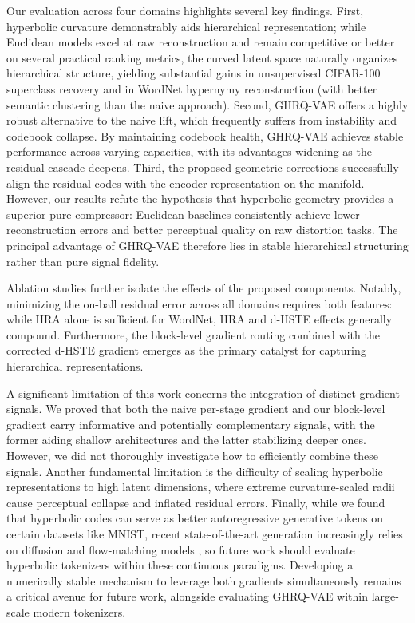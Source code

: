 \documentclass[12pt]{report}
\begin{document}
Our evaluation across four domains highlights several key findings. First, hyperbolic curvature demonstrably aids hierarchical representation; while Euclidean models excel at raw reconstruction and remain competitive or better on several practical ranking metrics, the curved latent space naturally organizes hierarchical structure, yielding substantial gains in unsupervised CIFAR-100 superclass recovery and in WordNet hypernymy reconstruction (with better semantic clustering than the naive approach). Second, GHRQ-VAE offers a highly robust alternative to the naive lift, which frequently suffers from instability and codebook collapse. By maintaining codebook health, GHRQ-VAE achieves stable performance across varying capacities, with its advantages widening as the residual cascade deepens. Third, the proposed geometric corrections successfully align the residual codes with the encoder representation on the manifold. However, our results refute the hypothesis that hyperbolic geometry provides a superior pure compressor: Euclidean baselines consistently achieve lower reconstruction errors and better perceptual quality on raw distortion tasks. The principal advantage of GHRQ-VAE therefore lies in stable hierarchical structuring rather than pure signal fidelity.

Ablation studies further isolate the effects of the proposed components. Notably, minimizing the on-ball residual error across all domains requires both features: while HRA alone is sufficient for WordNet, HRA and d-HSTE effects generally compound. Furthermore, the block-level gradient routing combined with the corrected d-HSTE gradient emerges as the primary catalyst for capturing hierarchical representations.

A significant limitation of this work concerns the integration of distinct gradient signals. We proved that both the naive per-stage gradient and our block-level gradient carry informative and potentially complementary signals, with the former aiding shallow architectures and the latter stabilizing deeper ones. However, we did not thoroughly investigate how to efficiently combine these signals. Another fundamental limitation is the difficulty of scaling hyperbolic representations to high latent dimensions, where extreme curvature-scaled radii cause perceptual collapse and inflated residual errors. Finally, while we found that hyperbolic codes can serve as better autoregressive generative tokens on certain datasets like MNIST, recent state-of-the-art generation increasingly relies on diffusion and flow-matching models \cite{resgen}, so future work should evaluate hyperbolic tokenizers within these continuous paradigms. Developing a numerically stable mechanism to leverage both gradients simultaneously remains a critical avenue for future work, alongside evaluating GHRQ-VAE within large-scale modern tokenizers.
\end{document}
